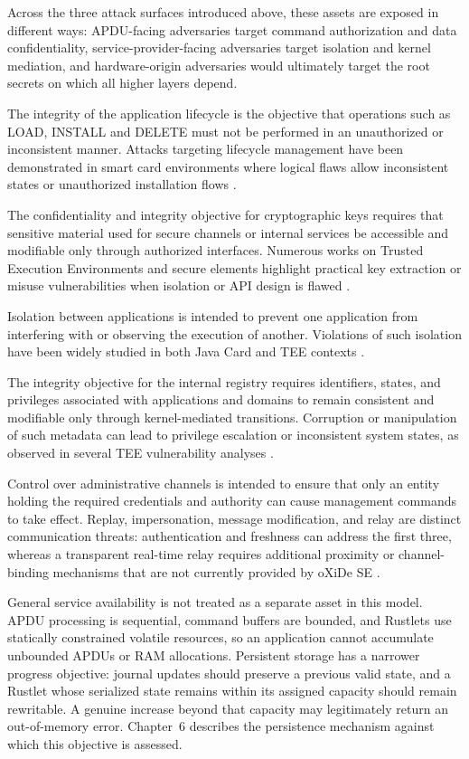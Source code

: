 Across the three attack surfaces introduced above, these assets are exposed in
different ways: APDU-facing adversaries target command authorization and data
confidentiality, service-provider-facing adversaries target isolation and
kernel mediation, and hardware-origin adversaries would ultimately target the
root secrets on which all higher layers depend.

The integrity of the application lifecycle is the objective that operations
such as LOAD, INSTALL and DELETE must not be performed in an unauthorized or
inconsistent manner. Attacks targeting lifecycle management
have been demonstrated in smart card environments where logical flaws allow
inconsistent states or unauthorized installation flows
\cite{mostowski2008malicious, barbu2010javacard}.

The confidentiality and integrity objective for cryptographic keys requires
that sensitive material used for secure channels or internal services be
accessible and modifiable only through authorized interfaces. Numerous works
on Trusted Execution Environments and secure elements
highlight practical key extraction or misuse vulnerabilities when isolation or
API design is flawed \cite{shakevsky2022keymaster, busch2020trustedcore}.

Isolation between applications is intended to prevent one application from
interfering with or observing the execution of another. Violations of such
isolation have been widely studied in both Java Card and TEE contexts
\cite{mostowski2008malicious, cerdeira2022rezone}.

The integrity objective for the internal registry requires identifiers, states,
and privileges associated with applications and domains to remain consistent
and modifiable only through kernel-mediated transitions. Corruption or
manipulation of such metadata can lead to privilege
escalation or inconsistent system states, as observed in several TEE
vulnerability analyses \cite{munoz2023tee}.

Control over administrative channels is intended to ensure that only an entity
holding the required credentials and authority can cause management commands to
take effect. Replay, impersonation, message modification, and relay are distinct
communication threats: authentication and freshness can address the first
three, whereas a transparent real-time relay requires additional proximity or
channel-binding mechanisms that are not currently provided by oXiDe SE
\cite{roland2012relay, francis2011relay}.

General service availability is not treated as a separate asset in this model.
APDU processing is sequential, command buffers are bounded, and Rustlets use
statically constrained volatile resources, so an application cannot accumulate
unbounded APDUs or RAM allocations. Persistent storage has a narrower progress
objective: journal updates should preserve a previous valid state, and a
Rustlet whose serialized state remains within its assigned capacity should
remain rewritable. A genuine increase beyond that capacity may legitimately
return an out-of-memory error. Chapter~6 describes the persistence mechanism
against which this objective is assessed.

